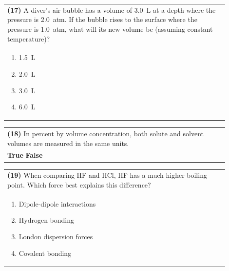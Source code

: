 \documentclass{article}
\begin{document}
\noindent\begin{tabular}{|p{0.9\linewidth}|}
\hline
\textbf{(17)} A diver's air bubble has a volume of 3.0~L at a depth where the pressure is 2.0~atm. If the bubble rises to the surface where the pressure is 1.0~atm, what will its new volume be (assuming constant temperature)?\\[0.2cm]
\begin{minipage}[t]{0.85\linewidth}
\begin{enumerate}[label=\alph*.]
\item 1.5~L
\item 2.0~L
\item 3.0~L
\item 6.0~L
\end{enumerate}
\end{minipage}\\[0.2cm]
\hline
\end{tabular}

\vspace{0.2cm}
\noindent\begin{tabular}{|p{0.9\linewidth}|}
\hline
\textbf{(18)} In percent by volume concentration, both solute and solvent volumes are measured in the same units.\\[0.2cm]
\textbf{True} \hspace{1cm} \textbf{False}\\[0.2cm]
\hline
\end{tabular}

\vspace{0.2cm}
\noindent\begin{tabular}{|p{0.9\linewidth}|}
\hline
\textbf{(19)} When comparing HF and HCl, HF has a much higher boiling point. Which force best explains this difference?\\[0.2cm]
\begin{minipage}[t]{0.85\linewidth}
\begin{enumerate}[label=\alph*.]
\item Dipole-dipole interactions
\item Hydrogen bonding
\item London dispersion forces
\item Covalent bonding
\end{enumerate}
\end{minipage}\\[0.2cm]
\hline
\end{tabular}
\end{document}
